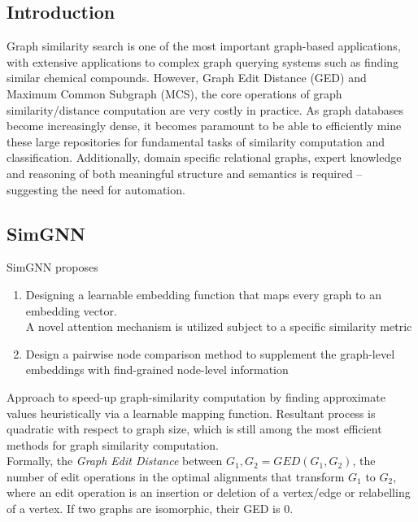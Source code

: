 \documentclass{article}
\begin{document}
\subsection{Introduction}

Graph similarity search is one of the most important graph-based applications, with extensive applications to complex graph querying systems such as finding similar chemical compounds.
However, Graph Edit Distance (GED) and Maximum Common Subgraph (MCS), the core operations of graph similarity/distance computation are very costly in practice.
As graph databases become increasingly dense, it becomes paramount to be able to efficiently mine these large repositories for fundamental tasks of similarity computation and classification.
Additionally, domain specific relational graphs, expert knowledge and reasoning of both meaningful structure and semantics is required – suggesting the need for automation.

\subsection{SimGNN}
SimGNN \cite{bai2019simgnn} proposes
\begin{enumerate}
    \item Designing a learnable embedding function that maps every graph to an embedding vector.\\
        A novel attention mechanism is utilized subject to a specific similarity metric
    \item Design a pairwise node comparison method to supplement the graph-level embeddings with find-grained node-level information
\end{enumerate}
Approach to speed-up graph-similarity computation by finding approximate values heuristically via a learnable mapping function. Resultant process is quadratic with respect to graph size, which is still among the most efficient methods for graph similarity computation.\\

Formally, the \textit{Graph Edit Distance} between $G_1, G_2 = GED(G_1, G_2)$, the number of edit operations in the optimal alignments that transform $G_1$ to $G_2$, where an edit operation is an insertion or deletion of a vertex/edge or relabelling of a vertex.
If two graphs are isomorphic, their GED is 0.\\
\end{document}
